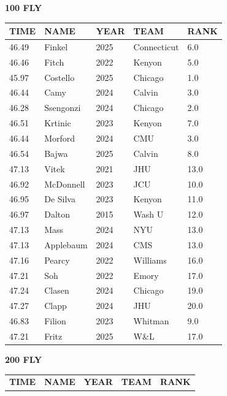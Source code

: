 \begin{table}[H]
\centering
\begin{minipage}[t]{0.48\textwidth}
\centering
\textbf{100 FLY}\\[0.1cm]
\begin{tabular}{@{}p{1.8cm}p{2.8cm}p{1.2cm}p{1.4cm}p{0.8cm}@{}}
\hline
    \textbf{TIME} & \textbf{NAME} & \textbf{YEAR} & \textbf{TEAM} & \textbf{RANK} \\
\hline
    46.49 & Finkel & 2025 & Connecticut & 6.0 \\
    46.46 & Fitch & 2022 & Kenyon & 5.0 \\
    45.97 & Costello & 2025 & Chicago & 1.0 \\
    46.44 & Camy & 2024 & Calvin & 3.0 \\
    46.28 & Ssengonzi & 2024 & Chicago & 2.0 \\
    46.51 & Krtinic & 2023 & Kenyon & 7.0 \\
    46.44 & Morford & 2024 & CMU & 3.0 \\
    46.54 & Bajwa & 2025 & Calvin & 8.0 \\
    47.13 & Vitek & 2021 & JHU & 13.0 \\
    46.92 & McDonnell & 2023 & JCU & 10.0 \\
    46.95 & De Silva & 2023 & Kenyon & 11.0 \\
    46.97 & Dalton & 2015 & Wash U & 12.0 \\
    47.13 & Mass & 2024 & NYU & 13.0 \\
    47.13 & Applebaum & 2024 & CMS & 13.0 \\
    47.16 & Pearcy & 2022 & Williams & 16.0 \\
    47.21 & Soh & 2022 & Emory & 17.0 \\
    47.24 & Clasen & 2024 & Chicago & 19.0 \\
    47.27 & Clapp & 2024 & JHU & 20.0 \\
    46.83 & Filion & 2023 & Whitman & 9.0 \\
    47.21 & Fritz & 2025 & W\&L & 17.0 \\
\hline
\end{tabular}
\end{minipage}\hfill
\begin{minipage}[t]{0.48\textwidth}
\centering
\textbf{200 FLY}\\[0.1cm]
\begin{tabular}{@{}p{1.8cm}p{2.8cm}p{1.2cm}p{1.4cm}p{0.8cm}@{}}
\hline
    \textbf{TIME} & \textbf{NAME} & \textbf{YEAR} & \textbf{TEAM} & \textbf{RANK} \\

\end{tabular}
\end{minipage}
\end{table}
